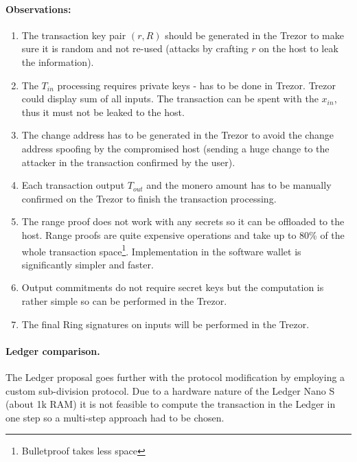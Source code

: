 \documentclass[]{article}
\begin{document}
\paragraph{Observations:}
\begin{enumerate}
    \item The transaction key pair $(r,R)$ should be generated in the Trezor to make sure it is random and not re-used (attacks by crafting $r$ on the host to leak the information). 
	
	\item The $T_{in}$ processing requires private keys - has to be done in Trezor. Trezor could display sum of all inputs. The transaction can be spent with the $x_{in}$, thus it must not be leaked to the host.
	
	\item The change address has to be generated in the Trezor to avoid the change address spoofing by the compromised host (sending a huge change to the attacker in the transaction confirmed by the user).
	
	\item Each transaction output $T_{out}$ and the monero amount has to be manually confirmed on the Trezor to finish the transaction processing.
	
	\item The range proof does not work with any secrets so it can be offloaded to the host. Range proofs are quite expensive operations and take up to 80\% of the whole transaction space\footnote{Bulletproof takes less space}. Implementation in the software wallet is significantly simpler and faster.
	
	\item Output commitments do not require secret keys but the computation is rather simple so can be performed in the Trezor.
	
	\item The final Ring signatures on inputs will be performed in the Trezor.
\end{enumerate}

\paragraph{Ledger comparison.} The Ledger proposal \cite{ledger_doc} goes further with the protocol modification by employing a custom sub-division protocol. Due to a hardware nature of the Ledger Nano S (about 1k RAM) it is not feasible to compute the transaction in the Ledger in one step so a multi-step approach had to be chosen.
\end{document}
